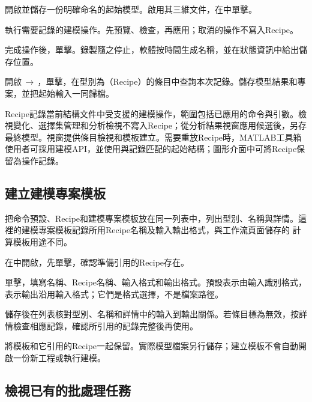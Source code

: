 \begin{steps}
  \item 開啟並儲存一份明確命名的起始模型。啟用其三維文件，在中單擊。
  \item 執行需要記錄的建模操作。先預覽、檢查，再應用；取消的操作不寫入Recipe。
  \item 完成操作後，單擊。錄製隨之停止，軟體按時間生成名稱，並在狀態資訊中給出儲存位置。
  \item 開啟\,$\rightarrow$\,，單擊，在型別為（Recipe）的條目中查詢本次記錄。儲存模型結果和專案，並把起始輸入一同歸檔。
\end{steps}

Recipe記錄當前結構文件中受支援的建模操作，範圍包括已應用的命令與引數。檢視變化、選擇集管理和分析檢視不寫入Recipe；從分析結果視窗應用候選後，另存最終模型。視窗提供條目檢視和模板建立。需要重放Recipe時，MATLAB\regmark{}工具箱使用者可採用建模API，並使用與記錄匹配的起始結構；圖形介面中可將Recipe保留為操作記錄。

\subsection{建立建模專案模板}\label{sec:modeling-template-reference}

把命令預設、Recipe和建模專案模板放在同一列表中，列出型別、名稱與詳情。這裡的建模專案模板記錄所用Recipe名稱及輸入輸出格式，與工作流頁面儲存的  計算模板用途不同。

\begin{steps}
  \item 在中開啟，先單擊，確認準備引用的Recipe存在。
  \item 單擊，填寫名稱、Recipe名稱、輸入格式和輸出格式。預設表示由輸入識別格式，表示輸出沿用輸入格式；它們是格式選擇，不是檔案路徑。
  \item 儲存後在列表核對型別、名稱和詳情中的輸入到輸出關係。若條目標為無效，按詳情檢查相應記錄，確認所引用的記錄完整後再使用。
  \item 將模板和它引用的Recipe一起保留。實際模型檔案另行儲存；建立模板不會自動開啟一份新工程或執行建模。
\end{steps}

\subsection{檢視已有的批處理任務}\label{sec:modeling-jobs-reference}

